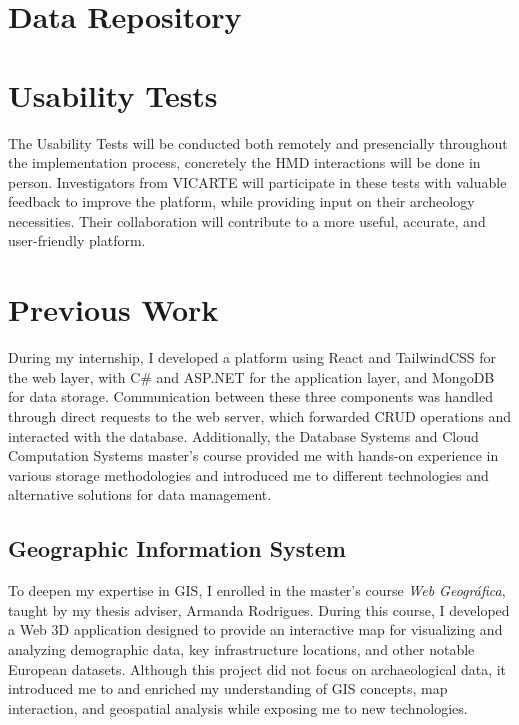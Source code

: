 \section{Data Repository}
\label{sec:data_repository}


\section{Usability Tests}
\label{sec:usability_tests}

The Usability Tests will be conducted both remotely and presencially throughout the implementation process, concretely the \gls{HMD} interactions will be done in person.
Investigators from \gls{VICARTE} will participate in these tests with valuable feedback to improve the platform, while providing input on their archeology necessities. Their collaboration will contribute to a more useful, accurate, and user-friendly platform.

\section{Previous Work}
\label{sec:previous_work}

During my internship, I developed a platform using React and TailwindCSS for the web layer, with C\# and ASP.NET for the application layer, and MongoDB for data storage. Communication between these three components was handled through direct requests to the web server, which forwarded \gls{CRUD} operations and interacted with the database.  
Additionally, the Database Systems and Cloud Computation Systems master's course provided me with hands-on experience in various storage methodologies and introduced me to different technologies and alternative solutions for data management.

\subsection{Geographic Information System}
\label{sec:gis_previous} 

To deepen my expertise in \gls{GIS}, I enrolled in the master's course \textit{Web Geográfica}, taught by my thesis adviser, Armanda Rodrigues. During this course, I developed a Web \gls{3D} application designed to provide an interactive map for visualizing and analyzing demographic data, key infrastructure locations, and other notable European datasets. Although this project did not focus on archaeological data, it introduced me to and enriched my understanding of GIS concepts, map interaction, and geospatial analysis while exposing me to new technologies.

